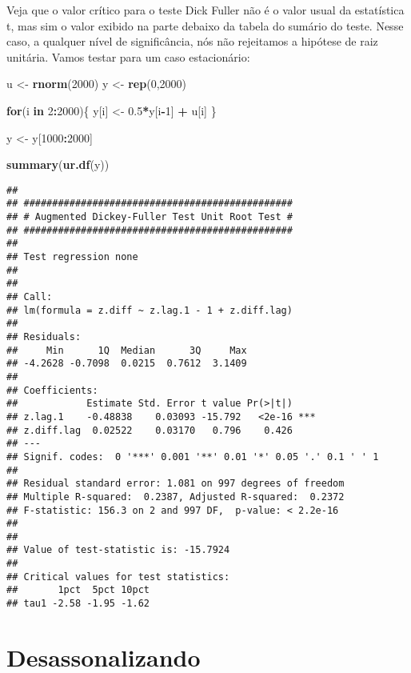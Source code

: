 \documentclass[]{book}
\newenvironment{Shaded}{\begin{snugshade}}{\end{snugshade}}
\newcommand{\KeywordTok}[1]{\textcolor[rgb]{0.13,0.29,0.53}{\textbf{#1}}}
\newcommand{\DecValTok}[1]{\textcolor[rgb]{0.00,0.00,0.81}{#1}}
\newcommand{\FloatTok}[1]{\textcolor[rgb]{0.00,0.00,0.81}{#1}}
\newcommand{\StringTok}[1]{\textcolor[rgb]{0.31,0.60,0.02}{#1}}
\newcommand{\ControlFlowTok}[1]{\textcolor[rgb]{0.13,0.29,0.53}{\textbf{#1}}}
\newcommand{\OperatorTok}[1]{\textcolor[rgb]{0.81,0.36,0.00}{\textbf{#1}}}
\newcommand{\NormalTok}[1]{#1}
\begin{document}
Veja que o valor crítico para o teste Dick Fuller não é o valor usual da
estatística t, mas sim o valor exibido na parte debaixo da tabela do
sumário do teste. Nesse caso, a qualquer nível de significância, nós não
rejeitamos a hipótese de raiz unitária. Vamos testar para um caso
estacionário:

\begin{Shaded}
\begin{Highlighting}[]
\NormalTok{u <-}\StringTok{ }\KeywordTok{rnorm}\NormalTok{(}\DecValTok{2000}\NormalTok{)}
\NormalTok{y <-}\StringTok{ }\KeywordTok{rep}\NormalTok{(}\DecValTok{0}\NormalTok{,}\DecValTok{2000}\NormalTok{)}

\ControlFlowTok{for}\NormalTok{(i }\ControlFlowTok{in} \DecValTok{2}\OperatorTok{:}\DecValTok{2000}\NormalTok{)\{}
\NormalTok{  y[i] <-}\StringTok{ }\FloatTok{0.5}\OperatorTok{*}\NormalTok{y[i}\OperatorTok{-}\DecValTok{1}\NormalTok{] }\OperatorTok{+}\StringTok{ }\NormalTok{u[i]}
\NormalTok{\}}

\NormalTok{y <-}\StringTok{ }\NormalTok{y[}\DecValTok{1000}\OperatorTok{:}\DecValTok{2000}\NormalTok{]}

\KeywordTok{summary}\NormalTok{(}\KeywordTok{ur.df}\NormalTok{(y))}
\end{Highlighting}
\end{Shaded}

\begin{verbatim}
## 
## ############################################### 
## # Augmented Dickey-Fuller Test Unit Root Test # 
## ############################################### 
## 
## Test regression none 
## 
## 
## Call:
## lm(formula = z.diff ~ z.lag.1 - 1 + z.diff.lag)
## 
## Residuals:
##     Min      1Q  Median      3Q     Max 
## -4.2628 -0.7098  0.0215  0.7612  3.1409 
## 
## Coefficients:
##            Estimate Std. Error t value Pr(>|t|)    
## z.lag.1    -0.48838    0.03093 -15.792   <2e-16 ***
## z.diff.lag  0.02522    0.03170   0.796    0.426    
## ---
## Signif. codes:  0 '***' 0.001 '**' 0.01 '*' 0.05 '.' 0.1 ' ' 1
## 
## Residual standard error: 1.081 on 997 degrees of freedom
## Multiple R-squared:  0.2387, Adjusted R-squared:  0.2372 
## F-statistic: 156.3 on 2 and 997 DF,  p-value: < 2.2e-16
## 
## 
## Value of test-statistic is: -15.7924 
## 
## Critical values for test statistics: 
##       1pct  5pct 10pct
## tau1 -2.58 -1.95 -1.62
\end{verbatim}

\section{Desassonalizando}\label{desassonalizando}
\end{document}
